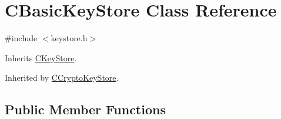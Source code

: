 \hypertarget{class_c_basic_key_store}{}\section{C\+Basic\+Key\+Store Class Reference}
\label{class_c_basic_key_store}


{\ttfamily \#include $<$keystore.\+h$>$}



Inherits \mbox{\hyperlink{class_c_key_store}{C\+Key\+Store}}.



Inherited by \mbox{\hyperlink{class_c_crypto_key_store}{C\+Crypto\+Key\+Store}}.

\subsection*{Public Member Functions}
